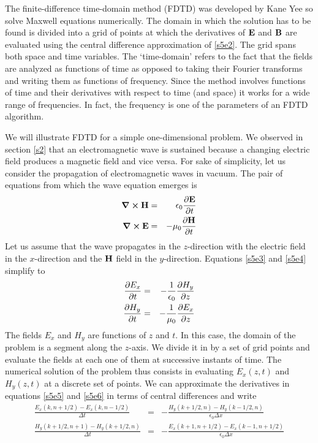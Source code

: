 \documentclass[11pt]{article}
\numberwithin{equation}{section}
\begin{document}
The finite-difference time-domain method (FDTD) was developed by Kane Yee
\cite{yee1966numerical} so solve Maxwell equations numerically. The domain
in which the solution has to be found is divided into a grid of points at
which the derivatives of $\vb{E}$ and $\vb{B}$ are evaluated using the
central difference approximation of \eqref{s5e2}. The grid spans both space
and time variables. The `time-domain' refers to the fact that the fields are
analyzed as functions of time as opposed to taking their Fourier transforms
and writing them as functions of frequency. Since the method involves
functions of time and their derivatives with respect to time (and space)
it works for a wide range of frequencies. In fact, the frequency is one of
the parameters of an FDTD algorithm.

We will illustrate FDTD for a simple one-dimensional problem. We observed
in section \ref{s2} that an electromagnetic wave is sustained because a 
changing electric field produces a magnetic field and vice versa. For sake
of simplicity, let us consider the propagation of electromagnetic waves in
vacuum. The pair of equations from which the wave equation emerges is
\begin{eqnarray}
\curl\vb{H} &=& \epsilon_0\pdv{\vb{E}}{t} \label{s5e3} \\
\curl\vb{E} &=& -\mu_0\pdv{\vb{H}}{t} \label{s5e4}
\end{eqnarray}
Let us assume that the wave propagates in the $z$-direction with the 
electric field in the $x$-direction and the $\vb{H}$ field in the
$y$-direction. Equations \eqref{s5e3} and \eqref{s5e4} simplify to
\begin{eqnarray}
\pdv{E_x}{t} &=& -\frac{1}{\epsilon_0}\pdv{H_y}{z} \label{s5e5} \\
\pdv{H_y}{t} &=& -\frac{1}{\mu_0}\pdv{E_x}{z} \label{s5e6}
\end{eqnarray}
The fields $E_x$ and $H_y$ are functions of $z$ and $t$. In this case, the
domain of the problem is a segment along the $z$-axis. We divide it in by a 
set of grid points and evaluate the fields at each one of them at successive
instants of time. The numerical solution of the problem thus consists in
evaluating $E_x(z, t)$ and $H_y(z, t)$ at a discrete set of points. We can
approximate the derivatives in equations \eqref{s5e5} and \eqref{s5e6} in
terms of central differences and write \cite{sullivan2013electromagnetic}
\begin{eqnarray}
\frac{E_x(k, n + 1/2) - E_x(k, n - 1/2)}{\Delta t} 
 &=& -\frac{H_y(k + 1/2, n) - H_y(k - 1/2, n)}{\epsilon_0\Delta x}
\label{s5e7} \\
\frac{H_y(k + 1/2, n + 1) - H_y(k + 1/2, n)}{\Delta t} 
&=&
-\frac{E_x(k + 1, n + 1/2) - E_x(k - 1, n + 1/2)}{\epsilon_0\Delta x}
\nonumber \\
 & & \label{s5e8} 
\end{eqnarray}
\end{document}
